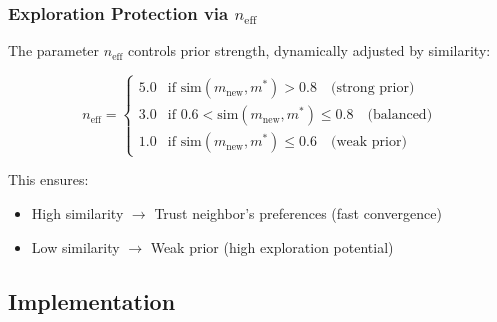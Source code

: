 \documentclass[sigconf]{acmart}
\begin{document}
\subsubsection{Exploration Protection via $n_{\text{eff}}$}

The parameter $n_{\text{eff}}$ controls prior strength, dynamically adjusted by similarity:

\begin{equation}
n_{\text{eff}} = \begin{cases}
5.0 & \text{if } \text{sim}(m_{\text{new}}, m^*) > 0.8 \quad \text{(strong prior)} \\
3.0 & \text{if } 0.6 < \text{sim}(m_{\text{new}}, m^*) \leq 0.8 \quad \text{(balanced)} \\
1.0 & \text{if } \text{sim}(m_{\text{new}}, m^*) \leq 0.6 \quad \text{(weak prior)}
\end{cases}
\end{equation}

This ensures:
\begin{itemize}
    \item High similarity $\rightarrow$ Trust neighbor's preferences (fast convergence)
    \item Low similarity $\rightarrow$ Weak prior (high exploration potential)
\end{itemize}

\subsection{Implementation}
\end{document}
